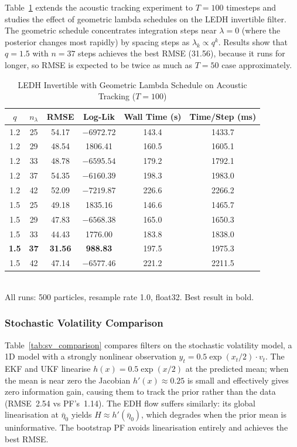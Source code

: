 \documentclass{article}
\begin{document}
Table~\ref{tab:acoustic_tracking_geometric} extends the acoustic tracking experiment to $T=100$ timesteps and studies the effect of geometric lambda schedules on the LEDH invertible filter. The geometric schedule concentrates integration steps near $\lambda=0$ (where the posterior changes most rapidly) by spacing steps as $\lambda_k \propto q^k$. Results show that $q=1.5$ with $n=37$ steps achieves the best RMSE (31.56), because it runs for longer, so RMSE is expected to be twice as much as $T=50$ case approximately.
\begin{table}[H]
\centering
\caption{LEDH Invertible with Geometric Lambda Schedule on Acoustic Tracking ($T=100$)}
\begin{tabular}{cccccc}
\toprule
\textbf{$q$} & \textbf{$n_\lambda$} & \textbf{RMSE} & \textbf{Log-Lik} & \textbf{Wall Time (s)} & \textbf{Time/Step (ms)} \\
\midrule
1.2 & 25 & 54.17 & $-6972.72$ & 143.4 & 1433.7 \\
1.2 & 29 & 48.54 & 1806.41    & 160.5 & 1605.1 \\
1.2 & 33 & 48.78 & $-6595.54$ & 179.2 & 1792.1 \\
1.2 & 37 & 54.35 & $-6160.39$ & 198.3 & 1983.0 \\
1.2 & 42 & 52.09 & $-7219.87$ & 226.6 & 2266.2 \\
\midrule
1.5 & 25 & 49.18 & 1835.16    & 146.6 & 1465.7 \\
1.5 & 29 & 47.83 & $-6568.38$ & 165.0 & 1650.3 \\
1.5 & 33 & 44.43 & 1776.00    & 183.8 & 1838.0 \\
\textbf{1.5} & \textbf{37} & \textbf{31.56} & \textbf{988.83} & 197.5 & 1975.3 \\
1.5 & 42 & 47.14 & $-6577.46$ & 221.2 & 2211.5 \\
\bottomrule
\end{tabular}
\\[0.5em]
{\small All runs: 500 particles, resample rate 1.0, float32. Best result in bold.}
\label{tab:acoustic_tracking_geometric}
\end{table}

\subsubsection{Stochastic Volatility Comparison}

Table~\ref{tab:sv_comparison} compares filters on the stochastic volatility model, a 1D model with a strongly nonlinear observation $y_t = 0.5\exp(x_t/2)\cdot v_t$. The EKF and UKF linearise $h(x) = 0.5\exp(x/2)$ at the predicted mean; when the mean is near zero the Jacobian $h'(x) \approx 0.25$ is small and effectively gives zero information gain, causing them to track the prior rather than the data (RMSE~2.54 vs PF's~1.14). The EDH flow suffers similarly: its global linearisation at $\bar\eta_0$ yields $H \approx h'(\bar\eta_0)$, which degrades when the prior mean is uninformative. The bootstrap PF avoids linearisation entirely and achieves the best RMSE. 
\end{document}
